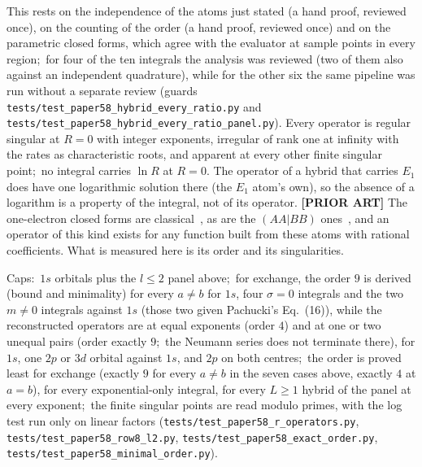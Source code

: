 \documentclass[aps,pra,twocolumn,superscriptaddress,longbibliography]{revtex4-2}
\begin{document}
This rests on the independence of the atoms just stated (a hand proof, reviewed once), on
the counting of the order (a hand proof, reviewed once) and on the parametric closed forms,
which agree with the evaluator at sample points in every region;\ for four of the ten
integrals the analysis was reviewed (two of them also against an independent quadrature),
while for the other six the same pipeline was run without a separate review (guards
\texttt{tests/test\_paper58\_hybrid\_every\_ratio.py} and
\texttt{tests/test\_paper58\_hybrid\_every\_ratio\_panel.py}).  Every operator is regular singular at
$R = 0$ with integer exponents, irregular of rank one at infinity with the rates as
characteristic roots, and apparent at every other finite singular point;\ no integral
carries $\ln R$ at $R = 0$.  The operator of a hybrid that carries $E_1$ does have one
logarithmic solution there (the $E_1$ atom's own), so the absence of a logarithm is a
property of the integral, not of its operator.  \textbf{[PRIOR ART]} The one-electron
closed forms are classical~\cite{mulliken1949,roothaan1951}, as are the $(AA|BB)$
ones~\cite{lesiuk2014a}, and an operator of this kind exists for any function built from these atoms with
rational coefficients.  What is measured here is its order and its singularities.

Caps:\ $1s$ orbitals plus the $l \le 2$ panel above;\ for exchange, the order $9$ is
derived (bound and minimality) for every $a\neq b$ for $1s$, four $\sigma=0$ integrals and the two
$m\neq0$ integrals against $1s$ (those two given Pachucki's Eq.~(16)), while the reconstructed operators
are at equal exponents (order $4$) and at one or two unequal pairs (order exactly $9$;\
the Neumann series does not terminate there), for $1s$, one $2p$ or $3d$ orbital against $1s$,
and $2p$ on both centres;\
the order is proved least for exchange (exactly $9$ for every $a\neq b$ in the seven cases above,
exactly $4$ at $a=b$), for every exponential-only integral, for every $L\ge1$ hybrid of the panel at every exponent;\ the finite singular points are read modulo primes, with the log test run only on linear
factors (\texttt{tests/test\_paper58\_r\_operators.py},
\texttt{tests/test\_paper58\_row8\_l2.py}, \texttt{tests/test\_paper58\_exact\_order.py},
\texttt{tests/test\_paper58\_minimal\_order.py}).
\end{document}
